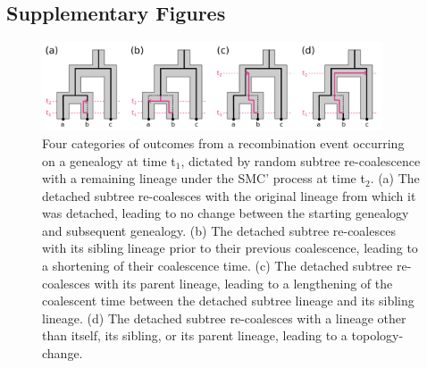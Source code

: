 \documentclass[11pt]{article}
\begin{document}
\subsection{Supplementary Figures}

\begin{figure}[p]
	\centering
	\includegraphics[width=0.9\textwidth]{figures/current/FigS1-recomb-types.pdf}
	\caption{
		Four categories of outcomes from a recombination event occurring on a
		genealogy at time t$_1$, dictated by random subtree re-coalescence with
		a remaining lineage under the SMC' process at time t$_2$. (a) The
		detached subtree re-coalesces with the original lineage from which it
		was detached, leading to no change between the starting genealogy and 
		subsequent genealogy. (b) The detached subtree re-coalesces with its
		sibling lineage prior to their previous coalescence, leading to a shortening
		of their coalescence time. (c) The detached subtree re-coalesces with
		its parent lineage, leading to a lengthening of the coalescent time 
		between the detached subtree lineage and its sibling lineage. (d) The
		detached subtree re-coalesces with a lineage other than itself, its sibling,
		or its parent lineage, leading to a topology-change. 
	}
     \label{fig:figS-recomb-types}
\end{figure}
\end{document}
